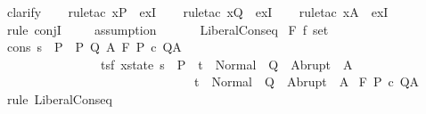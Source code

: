 \begin{isabellebody}
\ clarify\isanewline
\ \ \isamarkupfalse%
\ {\isacharparenleft}rule{\isacharunderscore}tac\ x{\isacharequal}P{\isacharprime}\ \ exI{\isacharparenright}\isanewline
\ \ \isamarkupfalse%
\ {\isacharparenleft}rule{\isacharunderscore}tac\ x{\isacharequal}Q{\isacharprime}\ \ exI{\isacharparenright}\isanewline
\ \ \isamarkupfalse%
\ {\isacharparenleft}rule{\isacharunderscore}tac\ x{\isacharequal}A{\isacharprime}\ \ exI{\isacharparenright}\isanewline
\ \ \isamarkupfalse%
\ {\isacharparenleft}rule\ conjI{\isacharparenright}\isanewline
\ \ \isamarkupfalse%
\ \ assumption\isanewline
\ \ \isanewline
\ \ \isamarkupfalse%
%
\endisatagproof
{\isafoldproof}%
%
\isadelimproof
\isanewline
%
\endisadelimproof
\isanewline
{}\isamarkupfalse%
\ LiberalConseq{\isacharprime}{\isacharcolon}\isanewline
{}\ F{\isacharcolon}{\isacharcolon}\ {\isachardoublequoteopen}{\isacharprime}f\ set{\isachardoublequoteclose}\isanewline
{}\ cons{\isacharcolon}\ {\isachardoublequoteopen}{\isasymforall}s\ {\isasymin}\ P{\isachardot}\ \ {\isasymexists}P{\isacharprime}\ Q{\isacharprime}\ A{\isacharprime}{\isachardot}\ {\isasymGamma}{\isacharcomma}{\isasymTheta}{\isasymturnstile}\isactrlbsub {\isacharslash}F\isactrlesub \ P{\isacharprime}\ c\ Q{\isacharprime}{\isacharcomma}A{\isacharprime}\ {\isasymand}\isanewline
\ \ \ \ \ \ \ \ \ \ \ \ \ \ \ \ {\isacharparenleft}{\isasymforall}{\isacharparenleft}t{\isacharcolon}{\isacharcolon}{\isacharparenleft}{\isacharprime}s{\isacharcomma}{\isacharprime}f{\isacharparenright}\ xstate{\isacharparenright}{\isachardot}\ {\isacharparenleft}s\ {\isasymin}\ P{\isacharprime}\ {\isasymlongrightarrow}\ t\ {\isasymin}\ Normal\ {\isacharbackquote}\ Q{\isacharprime}\ {\isasymunion}\ Abrupt\ {\isacharbackquote}\ A{\isacharprime}{\isacharparenright}\isanewline
\ \ \ \ \ \ \ \ \ \ \ \ \ \ \ \ \ \ \ \ \ \ \ \ \ \ \ \ \ \ {\isasymlongrightarrow}\ t\ {\isasymin}\ Normal\ {\isacharbackquote}\ Q\ {\isasymunion}\ Abrupt\ {\isacharbackquote}\ A{\isacharparenright}{\isachardoublequoteclose}\isanewline
{}\ {\isachardoublequoteopen}{\isasymGamma}{\isacharcomma}{\isasymTheta}{\isasymturnstile}\isactrlbsub {\isacharslash}F\isactrlesub \ P\ c\ Q{\isacharcomma}A\ {\isachardoublequoteclose}\isanewline
%
\isadelimproof
%
\endisadelimproof
%
\isatagproof
{}\isamarkupfalse%
\ {\isacharparenleft}rule\ LiberalConseq{\isacharparenright}\isanewline
{}\isamarkupfalse%

\end{isabellebody}
